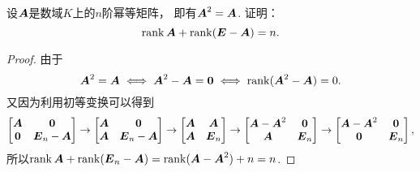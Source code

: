 \begin{example}\label{example:幂等矩阵.幂等矩阵的秩的性质1}
设\(\boldsymbol{A}\)是数域\(K\)上的\(n\)阶幂等矩阵，
即有\(\boldsymbol{A}^2=\boldsymbol{A}\).
证明：\begin{equation*}
	\rank\boldsymbol{A}+\rank(\boldsymbol{E}-\boldsymbol{A})=n.
\end{equation*}
\begin{proof}
由于\begin{equation*}
	\boldsymbol{A}^2=\boldsymbol{A}
	\iff
	\boldsymbol{A}^2-\boldsymbol{A}=\boldsymbol0
	\iff
	\rank(\boldsymbol{A}^2-\boldsymbol{A})=0.
\end{equation*}
又因为利用初等变换可以得到\begin{equation*}
	\begin{bmatrix}
		\boldsymbol{A} & \boldsymbol0 \\
		\boldsymbol0 & \boldsymbol{E}_n-\boldsymbol{A}
	\end{bmatrix}
	\to \begin{bmatrix}
		\boldsymbol{A} & \boldsymbol0 \\
		\boldsymbol{A} & \boldsymbol{E}_n-\boldsymbol{A}
	\end{bmatrix}
	\to \begin{bmatrix}
		\boldsymbol{A} & \boldsymbol{A} \\
		\boldsymbol{A} & \boldsymbol{E}_n
	\end{bmatrix}
	\to \begin{bmatrix}
		\boldsymbol{A}-\boldsymbol{A}^2 & \boldsymbol0 \\
		\boldsymbol{A} & \boldsymbol{E}_n
	\end{bmatrix}
	\to \begin{bmatrix}
		\boldsymbol{A}-\boldsymbol{A}^2 & \boldsymbol0 \\
		\boldsymbol0 & \boldsymbol{E}_n
	\end{bmatrix},
\end{equation*}
所以\(\rank\boldsymbol{A}+\rank(\boldsymbol{E}_n-\boldsymbol{A})
=\rank(\boldsymbol{A}-\boldsymbol{A}^2)+n
=n\).
\end{proof}
\end{example}

